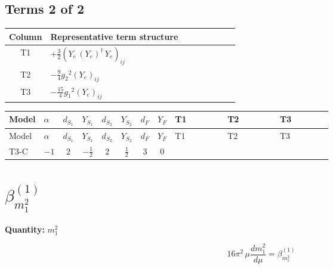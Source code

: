 \documentclass[8pt]{article}
\begin{document}
\begin{landscape}
\subsection*{Terms 2 of 2}
\begin{center}
\begin{tabular}{@{}c >{\raggedright\arraybackslash}p{0.82\linewidth}@{}}
\toprule
Column & Representative term structure \\
\midrule
T1 & \(\displaystyle +\frac{3}{2} \left({Y_e}\,\left({Y_e}\right)^{\dagger}\,{Y_e}\right)_{ij}\) \\
\midrule
T2 & \(\displaystyle -\frac{9}{4} {g_2}^2 \left({Y_e}\right)_{ij}\) \\
\midrule
T3 & \(\displaystyle -\frac{15}{4} {g_1}^2 \left({Y_e}\right)_{ij}\) \\
\midrule
\bottomrule
\end{tabular}
\end{center}
\smallskip
\tiny
\begin{longtable}{@{}llcccccc >{\raggedright\arraybackslash}p{0.21\linewidth} >{\raggedright\arraybackslash}p{0.21\linewidth} >{\raggedright\arraybackslash}p{0.21\linewidth}@{}}
\toprule
Model & $\alpha$ & $d_{S_1}$ & $Y_{S_1}$ & $d_{S_2}$ & $Y_{S_2}$ & $d_F$ & $Y_F$ & T1 & T2 & T3 \\
\midrule
\endfirsthead
\toprule
Model & $\alpha$ & $d_{S_1}$ & $Y_{S_1}$ & $d_{S_2}$ & $Y_{S_2}$ & $d_F$ & $Y_F$ & T1 & T2 & T3 \\
\midrule
\endhead
T3-C & $-1$ & $2$ & $-\frac{1}{2}$ & $2$ & $\frac{1}{2}$ & $3$ & $0$ & \scriptsize\adjustbox{max width=\linewidth}{$\begin{gathered} +\frac{3}{2} \left({Y_e}\,\left({Y_e}\right)^{\dagger}\,{Y_e}\right)_{ij}\end{gathered}$} & \scriptsize\adjustbox{max width=\linewidth}{$\begin{gathered} -\frac{9}{4} {g_2}^2 \left({Y_e}\right)_{ij}\end{gathered}$} & \scriptsize\adjustbox{max width=\linewidth}{$\begin{gathered} -\frac{15}{4} {g_1}^2 \left({Y_e}\right)_{ij}\end{gathered}$} \\
\midrule
\bottomrule
\end{longtable}
\clearpage
\section*{$\beta_{m_1^2}^{(1)}$}
\noindent\textbf{Quantity: }$m_1^2$\par\smallskip
\[16\pi^2\,\mu\frac{d m_1^2}{d\mu}=\beta_{m_1^2}^{(1)}\]

\end{landscape}
\end{document}
